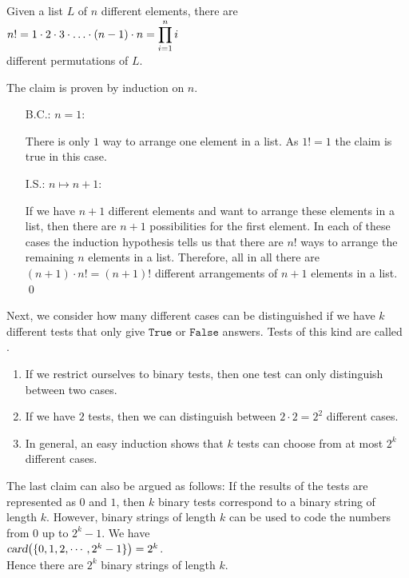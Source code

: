 \begin{Theorem}
Given a list $L$ of $n$ different elements, there are 
\\[0.2cm]
\hspace*{1.3cm}
$\displaystyle n! = 1 \cdot 2 \cdot 3 \cdot {\dots} \cdot (n-1) \cdot n = \prod\limits_{i=1}^n i$ 
\\[0.2cm]
different permutations of $L$. 
\end{Theorem}
\proof The claim is proven by induction on $n$. 
\begin{enumerate}
\item[B.C.:] $n=1$:  

      There is only $1$ way to arrange one element in a list.  As $1! = 1$ the claim is true in this case.
\item[I.S.:] $n \mapsto n+1$:
  
      If we have $n+1$ different elements and want to arrange these elements in a list, then there
      are $n+1$ possibilities for the first element.  In each of these cases the induction
      hypothesis tells us that there are $n!$ ways to arrange the remaining $n$ elements in a list.
      Therefore, all in all there are $(n+1) \cdot n! = (n+1)!$ different arrangements of $n+1$
      elements in a list. \qed
\end{enumerate}
Next, we consider how many different cases can be distinguished if we have $k$ different tests
that only give $\mathtt{True}$ or $\mathtt{False}$ answers.  Tests of this kind are called .
\begin{enumerate}
\item If we restrict ourselves to binary tests, then one test can only distinguish between two cases.
\item If we have $2$ tests, then we can distinguish between  $2 \cdot 2 = 2^2$ different cases.
\item In general, an easy induction shows that $k$ tests can choose from at most $2^k$ different cases.
\end{enumerate}
The last claim can also be argued as follows:  If the results of the tests are represented as
$0$ and $1$, then $k$ binary tests correspond to a binary string of length
$k$.  However, binary strings of length $k$ can be used to code the numbers from $0$ up to
$2^{k}-1$.  We have
\\[0.2cm]
\hspace*{1.3cm}
$\textsl{card}\bigl(\{0,1,2,\cdots, 2^k-1\}\bigr) = 2^k$.
\\[0.2cm]
Hence there are $2^k$ binary strings of length $k$.  


